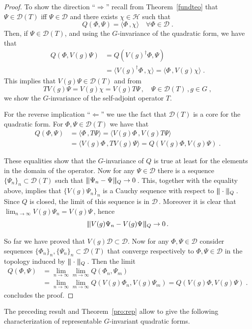 \documentclass[a4paper,12pt]{amsart}
\newcommand{\scalar}[2]{\langle#1\,,#2\rangle}
\newcommand{\normm}[1]{|\negthinspace\|#1\|\negthinspace|}
\renewcommand{\H}{\mathcal{H}}
\newcommand{\D}{\mathcal{D}}
\newcommand{\1}{\mathbb{I}}
\numberwithin{equation}{section}
\numberwithin{theorem}{section}
\begin{document}
\begin{proof}%
To show the direction ``$\Rightarrow$'' recall from
Theorem~\ref{fundteo} that $\Psi\in\D(T)$ iff $\Psi\in\D$ and there exists $\chi\in\H$ such that
$$Q(\Phi,\Psi)=\scalar{\Phi}{\chi}\quad\forall \Phi\in\D\;.$$
Then, if $\Psi\in\D(T)$, and using the $G$-invariance of the quadratic form, we have that
\begin{align*}
Q(\Phi,V(g)\Psi)&=Q(V(g)^\dagger\Phi,\Psi)\\
                &=\scalar{V(g)^\dagger\Phi}{\chi}=\scalar{\Phi}{V(g)\chi}\;.
\end{align*}
This implies that $V(g)\Psi\in\D(T)$ and from
$$TV(g)\Psi=V(g)\chi=V(g)T\Psi\,,\quad \Psi\in\D(T)\,,g\in G\;,$$
we show the $G$-invariance of the self-adjoint operator $T$.

For the reverse implication ``$\Leftarrow$''
we use the fact that $\D(T)$ is a core for the quadratic form.
For $\Phi,\Psi\in\D(T)$ we have that
\begin{align*}
 Q(\Phi,\Psi)&= \scalar{\Phi}{T\Psi}=\scalar{V(g)\Phi}{V(g)T\Psi} \\
             &= \scalar{V(g)\Phi}{TV(g)\Psi}=Q(V(g)\Phi,V(g)\Psi)\;.
\end{align*}

These equalities show that the $G$-invariance of $Q$ is true at least for the elements in the domain of the operator.
Now for any $\Psi\in\D$ there is a sequence
$\{\Psi_n\}_n\subset\D(T)$ such that $\normm{\Psi_n-\Psi}_Q\to 0$\,. This, together with the equality above,
implies that $\{V(g)\Psi_n\}_n$ is a Cauchy sequence with respect to $\normm{\cdot}_{Q}$\,. Since $Q$ is closed,
the limit of this sequence is in $\D$\,. Moreover it is clear that $\lim_{n\to\infty}V(g)\Psi_n=V(g)\Psi$\,,
hence
$$\normm{V(g)\Psi_n-V(g)\Psi}_Q\to0\,.$$

So far we have proved that $V(g)\D\subset\D$. Now for any $\Phi,\Psi\in\D$ consider
sequences $\{\Phi_n\}_n,\{\Psi_n\}_n\subset\D(T)$ that converge respectively to $\Phi,\Psi\in\D$ in the topology induced by $\normm{\cdot}_{Q}$\,. Then the limit
\begin{align*}
Q(\Phi,\Psi)&=\lim_{n\to\infty}\lim_{m\to\infty}Q(\Phi_n,\Psi_m)\\
            &=\lim_{n\to\infty}\lim_{m\to\infty}Q(V(g)\Phi_n,V(g)\Psi_m)=Q(V(g)\Phi,V(g)\Psi)\;.
\end{align*}
concludes the proof.
\end{proof}

The preceding result and Theorem~\ref{pro:rep} allow to give the following characterization of
representable $G$-invariant quadratic forms.
\end{document}
